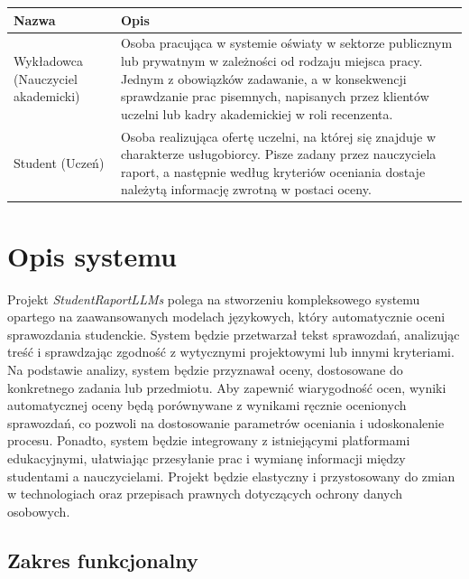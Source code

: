 \documentclass[a4paper, 12pt]{article}
\begin{document}
\begin{center}
\footnotesize
\begin{tabular}{|p{}|p{}|}
\hline
\textbf{Nazwa} & \textbf{Opis} \\
\hline
Wykładowca (Nauczyciel akademicki) & Osoba pracująca w systemie oświaty w sektorze publicznym lub prywatnym w zależności od rodzaju miejsca pracy. Jednym z obowiązków zadawanie, a w konsekwencji sprawdzanie prac pisemnych, napisanych przez klientów uczelni lub kadry akademickiej w roli recenzenta. \\
\hline
Student (Uczeń) & Osoba realizująca ofertę uczelni, na której się znajduje w charakterze usługobiorcy. Pisze zadany przez nauczyciela raport, a następnie według kryteriów oceniania dostaje należytą informację zwrotną w postaci oceny. \\
\hline
\end{tabular}
\end{center}

\section{Opis systemu}
Projekt \textit{StudentRaportLLMs} polega na stworzeniu kompleksowego systemu opartego na zaawansowanych modelach językowych, który automatycznie oceni sprawozdania studenckie. System będzie przetwarzał tekst sprawozdań, analizując treść i sprawdzając zgodność z wytycznymi projektowymi lub innymi kryteriami. Na podstawie analizy, system będzie przyznawał oceny, dostosowane do konkretnego zadania lub przedmiotu. Aby zapewnić wiarygodność ocen, wyniki automatycznej oceny będą porównywane z wynikami ręcznie ocenionych sprawozdań, co pozwoli na dostosowanie parametrów oceniania i udoskonalenie procesu. Ponadto, system będzie integrowany z istniejącymi platformami edukacyjnymi, ułatwiając przesyłanie prac i wymianę informacji między studentami a nauczycielami. Projekt będzie elastyczny i przystosowany do zmian w technologiach oraz przepisach prawnych dotyczących ochrony danych osobowych.
\subsection{Zakres funkcjonalny}
\end{document}
